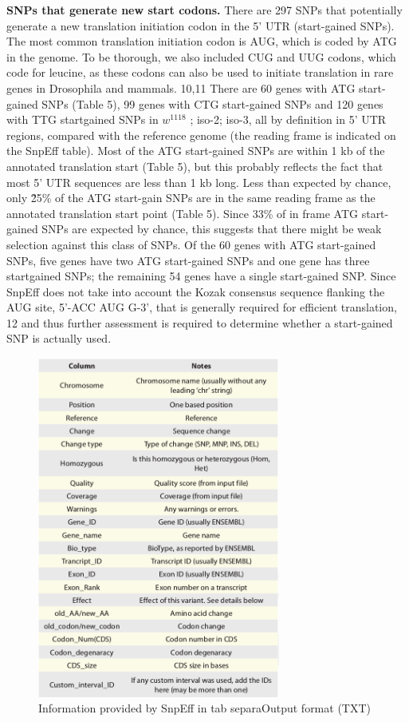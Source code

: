 \textbf{SNPs that generate new start codons.} There are 297 SNPs that potentially generate a new translation initiation codon in the 5' UTR (start-gained SNPs). The most common translation initiation codon is AUG, which is coded by ATG in the genome.  To be thorough, we also included CUG and UUG codons, which code for leucine, as these codons can also be used to initiate translation in rare genes in Drosophila and mammals. 10,11 There are 60 genes with ATG start-gained SNPs (Table 5), 99 genes with CTG start-gained SNPs and 120 genes with TTG startgained SNPs in $w^{1118}$ ; iso-2; iso-3, all by definition in 5' UTR regions, compared with the reference genome (the reading frame is indicated on the SnpEff table). Most of the ATG start-gained SNPs are within 1 kb of the annotated translation start (Table 5), but this probably reflects the fact that most 5' UTR sequences are less than 1 kb long. Less than expected by chance, only \~25\% of the ATG start-gain SNPs are in the same reading frame as the annotated translation start point (Table 5). Since 33\% of in frame ATG start-gained SNPs are expected by chance, this suggests that there might be weak selection against this class of SNPs. Of the 60 genes with ATG start-gained SNPs, five genes have two ATG start-gained SNPs and one gene has three startgained SNPs; the remaining 54 genes have a single start-gained SNP. Since SnpEff does not take into account the Kozak consensus sequence flanking the AUG site, 5'-ACC AUG G-3', that is generally required for efficient translation, 12 and thus further assessment is required to determine whether a start-gained SNP is actually used.

\begin{figure}
    \centering
    \includegraphics[width=8cm]{snpeff_table3.png}
    \caption{Information provided by SnpEff in tab separaOutput format
(TXT)}
    \label{fig:snpeffTab3}
\end{figure}


